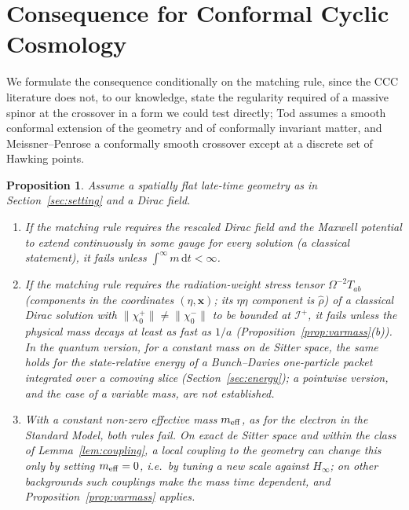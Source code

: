 \documentclass[11pt,a4paper]{article}
\newtheorem{proposition}{Proposition}
\theoremstyle{definition}
\newcommand{\scri}{\mathscr{I}^{+}}
\newcommand{\dd}{\mathrm{d}}
\begin{document}
\section{Consequence for Conformal Cyclic Cosmology}
\label{sec:ccc}

We formulate the consequence conditionally on the matching rule, since the CCC literature does not, to our knowledge, state the regularity required of a massive spinor at the crossover in a form we could test directly; Tod \cite{Tod2015} assumes a smooth conformal extension of the geometry and of conformally invariant matter, and Meissner--Penrose \cite{MeissnerPenrose2025} a conformally smooth crossover except at a discrete set of Hawking points.

\begin{proposition}
\label{prop:ccc}
Assume a spatially flat late-time geometry as in Section~\ref{sec:setting} and a Dirac field.
\begin{enumerate}[label=(\alph*)]
\item If the matching rule requires the rescaled Dirac field and the Maxwell potential to extend continuously in some gauge for every solution (a classical statement), it fails unless $\int^{\infty}m\,\dd t<\infty$.
\item If the matching rule requires the radiation-weight stress tensor $\Omega^{-2}T_{ab}$ (components in the coordinates $(\eta,\mathbf{x})$; its $\eta\eta$ component is $\hat\rho$) of a classical Dirac solution with $\|\chi_{0}^{+}\|\neq\|\chi_{0}^{-}\|$ to be bounded at $\scri$, it fails unless the physical mass decays at least as fast as $1/a$ (Proposition~\ref{prop:varmass}(b)). In the quantum version, for a constant mass on de Sitter space, the same holds for the state-relative energy of a Bunch--Davies one-particle packet integrated over a comoving slice (Section~\ref{sec:energy}); a pointwise version, and the case of a variable mass, are not established.
\item With a constant non-zero effective mass $m_{\rm eff}$, as for the electron in the Standard Model, both rules fail. On exact de Sitter space and within the class of Lemma~\ref{lem:coupling}, a local coupling to the geometry can change this only by setting $m_{\rm eff}=0$, i.e.\ by tuning a new scale against $H_{\infty}$; on other backgrounds such couplings make the mass time dependent, and Proposition~\ref{prop:varmass} applies.
\end{enumerate}
\end{proposition}
\end{document}
